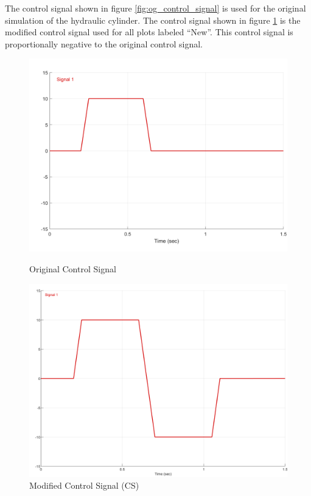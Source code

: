 The control signal shown in figure \ref{fig:og_control_signal} is used for the original simulation of the hydraulic cylinder. The control signal shown in figure \ref{fig:modified_control_signal} is the modified control signal used for all plots labeled ``New''. This control signal is proportionally negative to the original control signal.

\begin{figure}[H] \label{ fig-control-signal} 
  \begin{minipage}[b]{0.5\linewidth}
    \includegraphics[width=1\textwidth]{1_hydraulic_sim/normal_signal.png}
    \caption{Original Control Signal}
    \label{fig:og_control_signal}
  \end{minipage} 
  \begin{minipage}[b]{0.5\linewidth}
    \includegraphics[width=1\linewidth]{1_hydraulic_sim/Neg_Signal.png} 
    \caption{Modified Control Signal (CS)} 
    \label{fig:modified_control_signal}
  \end{minipage} 
\end{figure}

